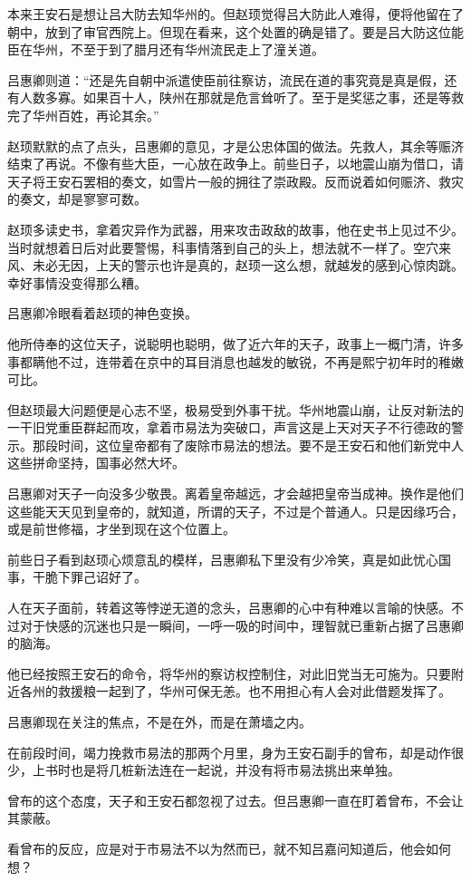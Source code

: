 本来王安石是想让吕大防去知华州的。但赵顼觉得吕大防此人难得，便将他留在了朝中，放到了审官西院上。但现在看来，这个处置的确是错了。要是吕大防这位能臣在华州，不至于到了腊月还有华州流民走上了潼关道。

吕惠卿则道：“还是先自朝中派遣使臣前往察访，流民在道的事究竟是真是假，还有人数多寡。如果百十人，陕州在那就是危言耸听了。至于是奖惩之事，还是等救完了华州百姓，再论其余。”

赵顼默默的点了点头，吕惠卿的意见，才是公忠体国的做法。先救人，其余等赈济结束了再说。不像有些大臣，一心放在政争上。前些日子，以地震山崩为借口，请天子将王安石罢相的奏文，如雪片一般的拥往了崇政殿。反而说着如何赈济、救灾的奏文，却是寥寥可数。

赵顼多读史书，拿着灾异作为武器，用来攻击政敌的故事，他在史书上见过不少。当时就想着日后对此要警惕，科事情落到自己的头上，想法就不一样了。空穴来风、未必无因，上天的警示也许是真的，赵顼一这么想，就越发的感到心惊肉跳。幸好事情没变得那么糟。

吕惠卿冷眼看着赵顼的神色变换。

他所侍奉的这位天子，说聪明也聪明，做了近六年的天子，政事上一概门清，许多事都瞒他不过，连带着在京中的耳目消息也越发的敏锐，不再是熙宁初年时的稚嫩可比。

但赵顼最大问题便是心志不坚，极易受到外事干扰。华州地震山崩，让反对新法的一干旧党重臣群起而攻，拿着市易法为突破口，声言这是上天对天子不行德政的警示。那段时间，这位皇帝都有了废除市易法的想法。要不是王安石和他们新党中人这些拼命坚持，国事必然大坏。

吕惠卿对天子一向没多少敬畏。离着皇帝越远，才会越把皇帝当成神。换作是他们这些能天天见到皇帝的，就知道，所谓的天子，不过是个普通人。只是因缘巧合，或是前世修福，才坐到现在这个位置上。

前些日子看到赵顼心烦意乱的模样，吕惠卿私下里没有少冷笑，真是如此忧心国事，干脆下罪己诏好了。

人在天子面前，转着这等悖逆无道的念头，吕惠卿的心中有种难以言喻的快感。不过对于快感的沉迷也只是一瞬间，一呼一吸的时间中，理智就已重新占据了吕惠卿的脑海。

他已经按照王安石的命令，将华州的察访权控制住，对此旧党当无可施为。只要附近各州的救援粮一起到了，华州可保无恙。也不用担心有人会对此借题发挥了。

吕惠卿现在关注的焦点，不是在外，而是在萧墙之内。

在前段时间，竭力挽救市易法的那两个月里，身为王安石副手的曾布，却是动作很少，上书时也是将几桩新法连在一起说，并没有将市易法挑出来单独。

曾布的这个态度，天子和王安石都忽视了过去。但吕惠卿一直在盯着曾布，不会让其蒙蔽。

看曾布的反应，应是对于市易法不以为然而已，就不知吕嘉问知道后，他会如何想？

